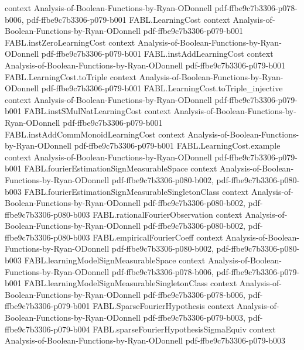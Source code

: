 \begin{theorem}
  {context}
  {Analysis-of-Boolean-Functions-by-Ryan-ODonnell}
  {pdf-ffbe9c7b3306-p078-b006,
    pdf-ffbe9c7b3306-p079-b001}
\proofstep
  {FABL.LearningCost}
  {context}
  {Analysis-of-Boolean-Functions-by-Ryan-ODonnell}
  {pdf-ffbe9c7b3306-p079-b001}
\proofstep
  {FABL.instZeroLearningCost}
  {context}
  {Analysis-of-Boolean-Functions-by-Ryan-ODonnell}
  {pdf-ffbe9c7b3306-p079-b001}
\proofstep
  {FABL.instAddLearningCost}
  {context}
  {Analysis-of-Boolean-Functions-by-Ryan-ODonnell}
  {pdf-ffbe9c7b3306-p079-b001}
\proofstep
  {FABL.LearningCost.toTriple}
  {context}
  {Analysis-of-Boolean-Functions-by-Ryan-ODonnell}
  {pdf-ffbe9c7b3306-p079-b001}
\proofstep
  {FABL.LearningCost.toTriple_injective}
  {context}
  {Analysis-of-Boolean-Functions-by-Ryan-ODonnell}
  {pdf-ffbe9c7b3306-p079-b001}
\proofstep
  {FABL.instSMulNatLearningCost}
  {context}
  {Analysis-of-Boolean-Functions-by-Ryan-ODonnell}
  {pdf-ffbe9c7b3306-p079-b001}
\proofstep
  {FABL.instAddCommMonoidLearningCost}
  {context}
  {Analysis-of-Boolean-Functions-by-Ryan-ODonnell}
  {pdf-ffbe9c7b3306-p079-b001}
\proofstep
  {FABL.LearningCost.example}
  {context}
  {Analysis-of-Boolean-Functions-by-Ryan-ODonnell}
  {pdf-ffbe9c7b3306-p079-b001}
\proofstep
  {FABL.fourierEstimationSignMeasurableSpace}
  {context}
  {Analysis-of-Boolean-Functions-by-Ryan-ODonnell}
  {pdf-ffbe9c7b3306-p080-b002,
    pdf-ffbe9c7b3306-p080-b003}
\proofstep
  {FABL.fourierEstimationSignMeasurableSingletonClass}
  {context}
  {Analysis-of-Boolean-Functions-by-Ryan-ODonnell}
  {pdf-ffbe9c7b3306-p080-b002,
    pdf-ffbe9c7b3306-p080-b003}
\proofstep
  {FABL.rationalFourierObservation}
  {context}
  {Analysis-of-Boolean-Functions-by-Ryan-ODonnell}
  {pdf-ffbe9c7b3306-p080-b002,
    pdf-ffbe9c7b3306-p080-b003}
\proofstep
  {FABL.empiricalFourierCoeff}
  {context}
  {Analysis-of-Boolean-Functions-by-Ryan-ODonnell}
  {pdf-ffbe9c7b3306-p080-b002,
    pdf-ffbe9c7b3306-p080-b003}
\proofstep
  {FABL.learningModelSignMeasurableSpace}
  {context}
  {Analysis-of-Boolean-Functions-by-Ryan-ODonnell}
  {pdf-ffbe9c7b3306-p078-b006,
    pdf-ffbe9c7b3306-p079-b001}
\proofstep
  {FABL.learningModelSignMeasurableSingletonClass}
  {context}
  {Analysis-of-Boolean-Functions-by-Ryan-ODonnell}
  {pdf-ffbe9c7b3306-p078-b006,
    pdf-ffbe9c7b3306-p079-b001}
\proofstep
  {FABL.SparseFourierHypothesis}
  {context}
  {Analysis-of-Boolean-Functions-by-Ryan-ODonnell}
  {pdf-ffbe9c7b3306-p079-b003,
    pdf-ffbe9c7b3306-p079-b004}
\proofstep
  {FABL.sparseFourierHypothesisSigmaEquiv}
  {context}
  {Analysis-of-Boolean-Functions-by-Ryan-ODonnell}
  {pdf-ffbe9c7b3306-p079-b003}

\end{theorem}
